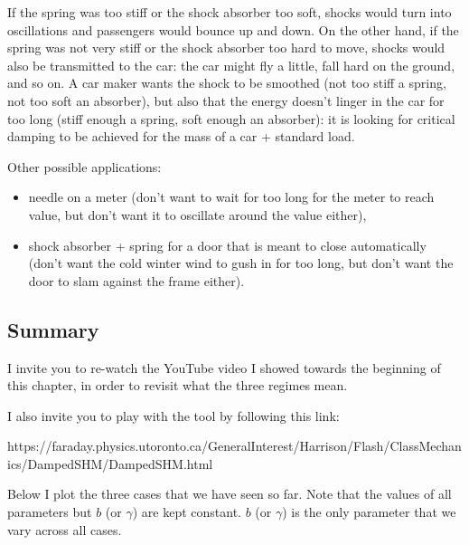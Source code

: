 \documentclass[11pt]{article}
\providecommand{\tightlist}{%
      \setlength{\itemsep}{0pt}\setlength{\parskip}{0pt}}
\begin{document}
    If the spring was too stiff or the shock absorber too soft, shocks would
turn into oscillations and passengers would bounce up and down. On the
other hand, if the spring was not very stiff or the shock absorber too
hard to move, shocks would also be transmitted to the car: the car might
fly a little, fall hard on the ground, and so on. A car maker wants the
shock to be smoothed (not too stiff a spring, not too soft an absorber),
but also that the energy doesn't linger in the car for too long (stiff
enough a spring, soft enough an absorber): it is looking for critical
damping to be achieved for the mass of a car + standard load.

    Other possible applications:

\begin{itemize}
\tightlist
\item
  needle on a meter (don't want to wait for too long for the meter to
  reach value, but don't want it to oscillate around the value either),
\item
  shock absorber + spring for a door that is meant to close
  automatically (don't want the cold winter wind to gush in for too
  long, but don't want the door to slam against the frame either).
\end{itemize}

    \hypertarget{summary}{%
\subsection{Summary}\label{summary}}

I invite you to re-watch the YouTube video I showed towards the
beginning of this chapter, in order to revisit what the three regimes
mean.

I also invite you to play with the tool by following this link:

https://faraday.physics.utoronto.ca/GeneralInterest/Harrison/Flash/ClassMechanics/DampedSHM/DampedSHM.html

Below I plot the three cases that we have seen so far. Note that the
values of all parameters but \(b\) (or \(\gamma\)) are kept constant.
\(b\) (or \(\gamma\)) is the only parameter that we vary across all
cases.
\end{document}
